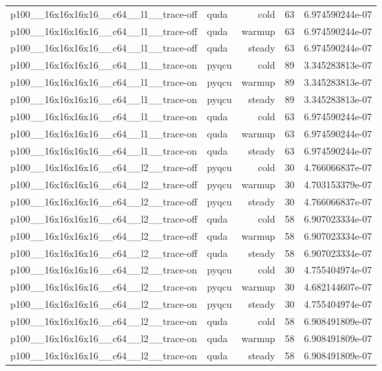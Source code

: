 \begin{table}[htbp]
\begin{tabular}{@{}llrrr@{}}
p100\_\_16x16x16x16\_\_c64\_\_l1\_\_trace-off & quda & cold & 63 & 6.974590244e-07 \\
p100\_\_16x16x16x16\_\_c64\_\_l1\_\_trace-off & quda & warmup & 63 & 6.974590244e-07 \\
p100\_\_16x16x16x16\_\_c64\_\_l1\_\_trace-off & quda & steady & 63 & 6.974590244e-07 \\
p100\_\_16x16x16x16\_\_c64\_\_l1\_\_trace-on & pyqcu & cold & 89 & 3.345283813e-07 \\
p100\_\_16x16x16x16\_\_c64\_\_l1\_\_trace-on & pyqcu & warmup & 89 & 3.345283813e-07 \\
p100\_\_16x16x16x16\_\_c64\_\_l1\_\_trace-on & pyqcu & steady & 89 & 3.345283813e-07 \\
p100\_\_16x16x16x16\_\_c64\_\_l1\_\_trace-on & quda & cold & 63 & 6.974590244e-07 \\
p100\_\_16x16x16x16\_\_c64\_\_l1\_\_trace-on & quda & warmup & 63 & 6.974590244e-07 \\
p100\_\_16x16x16x16\_\_c64\_\_l1\_\_trace-on & quda & steady & 63 & 6.974590244e-07 \\
p100\_\_16x16x16x16\_\_c64\_\_l2\_\_trace-off & pyqcu & cold & 30 & 4.766066837e-07 \\
p100\_\_16x16x16x16\_\_c64\_\_l2\_\_trace-off & pyqcu & warmup & 30 & 4.703153379e-07 \\
p100\_\_16x16x16x16\_\_c64\_\_l2\_\_trace-off & pyqcu & steady & 30 & 4.766066837e-07 \\
p100\_\_16x16x16x16\_\_c64\_\_l2\_\_trace-off & quda & cold & 58 & 6.907023334e-07 \\
p100\_\_16x16x16x16\_\_c64\_\_l2\_\_trace-off & quda & warmup & 58 & 6.907023334e-07 \\
p100\_\_16x16x16x16\_\_c64\_\_l2\_\_trace-off & quda & steady & 58 & 6.907023334e-07 \\
p100\_\_16x16x16x16\_\_c64\_\_l2\_\_trace-on & pyqcu & cold & 30 & 4.755404974e-07 \\
p100\_\_16x16x16x16\_\_c64\_\_l2\_\_trace-on & pyqcu & warmup & 30 & 4.682144607e-07 \\
p100\_\_16x16x16x16\_\_c64\_\_l2\_\_trace-on & pyqcu & steady & 30 & 4.755404974e-07 \\
p100\_\_16x16x16x16\_\_c64\_\_l2\_\_trace-on & quda & cold & 58 & 6.908491809e-07 \\
p100\_\_16x16x16x16\_\_c64\_\_l2\_\_trace-on & quda & warmup & 58 & 6.908491809e-07 \\
p100\_\_16x16x16x16\_\_c64\_\_l2\_\_trace-on & quda & steady & 58 & 6.908491809e-07 \\

\end{tabular}
\end{table}
